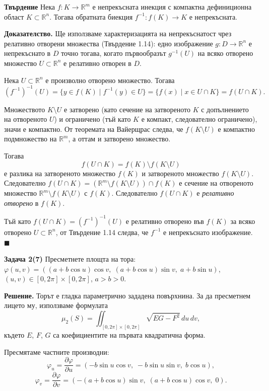 \documentclass[10pt]{article}
\begin{document}
\textbf{Твърдение} 
Нека $f : K \to \mathbb{R}^m$ е непрекъсната инекция с компактна дефиниционна област $K \subset \mathbb{R}^n$. Тогава обратната биекция $f^{-1} : f(K) \to K$ е непрекъсната.

\textbf{Доказателство.} 
Ще използваме характеризацията на непрекъснатост чрез релативно отворени множества (Твърдение 1.14): едно изображение $g : D \to \mathbb{R}^n$ е непрекъснато в $D$ точно тогава, когато първообразът $g^{-1}(U)$ на всяко отворено множество $U \subset \mathbb{R}^n$ е релативно отворен в $D$.

Нека $U \subset \mathbb{R}^n$ е произволно отворено множество. Тогава
\[
(f^{-1})^{-1}(U) = \{ y \in f(K) \mid f^{-1}(y) \in U \} = \{ f(x) \mid x \in U \cap K \} = f(U \cap K).
\]

Множеството $K \setminus U$ е затворено (като сечение на затвореното $K$ с допълнението на отвореното $U$) и ограничено (тъй като $K$ е компакт, следователно ограничено), значи е компактно. От теоремата на Вайерщрас следва, че $f(K \setminus U)$ е компактно подмножество на $\mathbb{R}^m$, а оттам и затворено множество.

Тогава
\[
f(U \cap K) = f(K) \setminus f(K \setminus U)
\]
е разлика на затвореното множество $f(K)$ и затвореното множество $f(K \setminus U)$. Следователно $f(U \cap K) = (\mathbb{R}^m \setminus f(K \setminus U)) \cap f(K)$ е сечение на отвореното множество $\mathbb{R}^m \setminus f(K \setminus U)$ с $f(K)$. Следователно $f(U \cap K)$ е \textit{релативно отворено} в $f(K)$.

Тъй като $f(U \cap K) = (f^{-1})^{-1}(U)$ е релативно отворено във $f(K)$ за всяко отворено $U \subset \mathbb{R}^n$, от Твърдение 1.14 следва, че $f^{-1}$ е непрекъснато изображение. $\blacksquare$


\textbf{Задача 2(7) }Пресметнете площта на тора: $\varphi(u,v) = ((a+b\cos u)\cos v,\; (a+b\cos u)\sin v,\; a+b\sin u)$, $(u,v)\in[0,2\pi]\times[0,2\pi]$, $a>b>0$. 

\textbf{Решение.} 
Торът е гладка параметрично зададена повърхнина. За да пресметнем лицето му, използваме формулата
\[
\mu_2(S) = \iint_{[0,2\pi]\times[0,2\pi]} \sqrt{EG - F^2} \, du\,dv,
\]
където $E$, $F$, $G$ са коефициентите на първата квадратична форма.

Пресмятаме частните производни:
\[
\varphi_u = \frac{\partial\varphi}{\partial u} = (-b\sin u \cos v,\; -b\sin u \sin v,\; b\cos u),
\]
\[
\varphi_v = \frac{\partial\varphi}{\partial v} = (-(a+b\cos u)\sin v,\; (a+b\cos u)\cos v,\; 0).
\]
\end{document}
